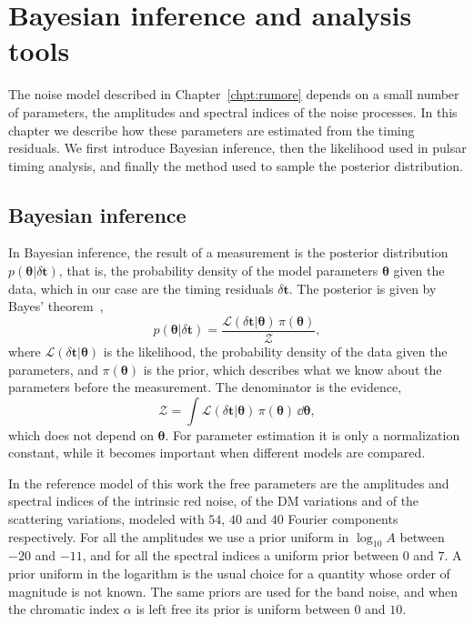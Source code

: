 \chapter{Bayesian inference and analysis tools} \label{chpt:inferenza}

The noise model described in Chapter~\ref{chpt:rumore} depends on a small
number of parameters, the amplitudes and spectral indices of the noise
processes. In this chapter we describe how these parameters are estimated from
the timing residuals. We first introduce Bayesian inference, then the
likelihood used in pulsar timing analysis, and finally the method used to
sample the posterior distribution.

\section{Bayesian inference} \label{sec:bayes}

In Bayesian inference, the result of a measurement is the posterior
distribution $p(\bm{\theta}|\delta\bm{t})$, that is, the probability density
of the model parameters $\bm{\theta}$ given the data, which in our case are the
timing residuals $\delta\bm{t}$. The posterior is given by Bayes'
theorem~\cite{ThraneTalbot2019},
\begin{equation}
    p(\bm{\theta}|\delta\bm{t}) =
    \frac{\mathcal{L}(\delta\bm{t}|\bm{\theta})\,\pi(\bm{\theta})}{\mathcal{Z}},
    \label{eq:bayes}
\end{equation}
where $\mathcal{L}(\delta\bm{t}|\bm{\theta})$ is the likelihood, the
probability density of the data given the parameters, and $\pi(\bm{\theta})$ is
the prior, which describes what we know about the parameters before the
measurement. The denominator is the evidence,
\begin{equation}
    \mathcal{Z} = \int \mathcal{L}(\delta\bm{t}|\bm{\theta})\,
    \pi(\bm{\theta})\,\dd\bm{\theta},
    \label{eq:evidence}
\end{equation}
which does not depend on $\bm{\theta}$. For parameter estimation it is only a
normalization constant, while it becomes important when different models are
compared. %

In the reference model of this work the free parameters are the amplitudes and
spectral indices of the intrinsic red noise, of the DM variations and of the
scattering variations, modeled with $54$, $40$ and $40$ Fourier components
respectively. For all the amplitudes we use a prior uniform in $\log_{10}A$
between $-20$ and $-11$, and for all the spectral indices a uniform prior
between $0$ and $7$. A prior uniform in the logarithm is the usual choice for
a quantity whose order of magnitude is not known. The same priors are used for
the band noise, and when the chromatic index $\alpha$ is left free its prior is
uniform between $0$ and $10$.


